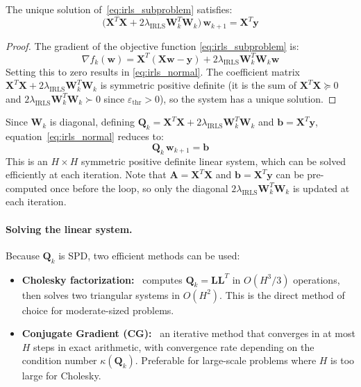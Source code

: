 \begin{proposition}
    \label{prop:irls_normal}
    The unique solution of~\eqref{eq:irls_subproblem} satisfies:
    \begin{equation}
        \bigl(\mathbf{X}^T\mathbf{X} + 2\lambda_{\text{IRLS}}\mathbf{W}_k^T \mathbf{W}_k \bigr)\,
        \mathbf{w}_{k+1} = \mathbf{X}^T\mathbf{y}
        \label{eq:irls_normal}
    \end{equation}
\end{proposition}

\begin{proof}
    The gradient of the objective function \eqref{eq:irls_subproblem} is:
    $$\nabla f_k(\mathbf{w}) = \mathbf{X}^T(\mathbf{Xw} - \mathbf{y}) + 2\lambda_{\text{IRLS}}\mathbf{W}_k^T \mathbf{W}_k\mathbf{w}$$
    Setting this to zero results in \eqref{eq:irls_normal}.
    The coefficient matrix $\mathbf{X}^T\mathbf{X} + 2\lambda_{\text{IRLS}}\mathbf{W}_k^T\mathbf{W}_k$
    is symmetric positive definite (it is the sum of $\mathbf{X}^T\mathbf{X} \succeq 0$
    and $2\lambda_{\text{IRLS}}\mathbf{W}_k^T\mathbf{W}_k \succ 0$ since $\varepsilon_{\mathrm{thr}} > 0$),
    so the system has a unique solution.
\end{proof}

Since $\mathbf{W}_k$ is diagonal, defining $\mathbf{Q}_k = \mathbf{X}^T\mathbf{X}
+2\lambda_{\text{IRLS}}\mathbf{W}_k^T\mathbf{W}_k$ and $\mathbf{b} = \mathbf{X}^T\mathbf{y}$,
equation~\eqref{eq:irls_normal} reduces to:
\begin{equation}
    \mathbf{Q}_k\, \mathbf{w}_{k+1} = \mathbf{b}
    \label{eq:irls_linear_system}
\end{equation}
This is an $H \times H$ symmetric positive definite linear system, which can
be solved efficiently at each iteration. Note that $\mathbf{A} = \mathbf{X}^T\mathbf{X}$ and $\mathbf{b} = \mathbf{X}^T\mathbf{y}$
can be pre-computed once before the loop, so only the diagonal $2\lambda_{\text{IRLS}}\mathbf{W}_k^T\mathbf{W}_k$ is updated at each iteration.

\paragraph{Solving the linear system.}
Because $\mathbf{Q}_k$ is SPD, two efficient methods can be used:
\begin{itemize}
    \item \textbf{Cholesky factorization:}~\cite{trefethen1997numerical} computes $\mathbf{Q}_k = \mathbf{L}\mathbf{L}^T$
    in $O(H^3/3)$ operations, then solves two triangular systems in $O(H^2)$. This
    is the direct method of choice for moderate-sized problems.
    \item \textbf{Conjugate Gradient (CG):}~\cite{trefethen1997numerical} an iterative method that converges in at
    most $H$ steps in exact arithmetic, with convergence rate depending on the condition
    number $\kappa(\mathbf{Q}_k)$. Preferable for large-scale problems where $H$ is
    too large for Cholesky.
\end{itemize}

